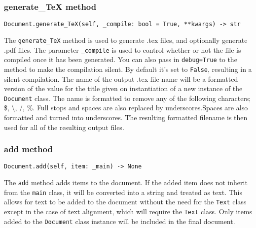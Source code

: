 \documentclass{article}
\begin{document}
\subsubsection{generate\_TeX method}\label{subsubsec:generate_tex_method}
\begin{verbatim}
Document.generate_TeX(self, _compile: bool = True, **kwargs) -> str
\end{verbatim}
The \verb|generate_TeX| method is used to generate .tex files, and optionally generate .pdf files. The parameter \verb|_compile| is used to control whether or not the file is compiled once it has been generated.  You can also pass in \verb|debug=True| to the method to make the compilation silent. By default it's set to \verb|False|, resulting in a silent compilation.
The name of the output .tex file name will be a formatted version of the value for the title given on instantiation of a new instance of the \verb|Document| class. The name is formatted to remove any of the following characters; \$, \textbackslash, /, \%. Full stops and spaces are also replaced by underscores.Spaces are also formatted and turned into underscores. The resulting formatted filename is then used for all of the resulting output files.
\subsubsection{add method}\label{subsubsec:add_method}
\begin{verbatim}
Document.add(self, item: _main) -> None
\end{verbatim}
The \verb|add| method adds items to the document. If the added item does not inherit from the \verb|main| class, it will be converted into a string and treated as text. This allows for text to be added to the document without the need for the \verb|Text| class except in the case of text alignment, which will require the \verb|Text| class. Only items added to the \verb|Document| class instance will be included in the final document.
\end{document}
